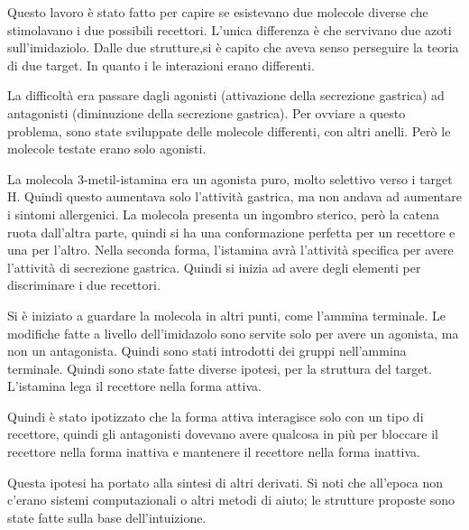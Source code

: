 Questo lavoro è stato fatto per capire se esistevano due molecole
diverse che stimolavano i due possibili recettori. L'unica differenza è
che servivano due azoti sull'imidaziolo.
Dalle due strutture,si è capito che aveva senso perseguire la teoria di
due target. In quanto i le interazioni erano differenti.


La difficoltà era passare dagli agonisti (attivazione della secrezione
gastrica) ad antagonisti (diminuzione della secrezione gastrica). Per
ovviare a questo problema, sono state sviluppate delle molecole
differenti, con altri anelli. Però le molecole testate erano solo
agonisti.


La molecola 3-metil-istamina era un agonista puro, molto selettivo verso
i target H. Quindi questo aumentava solo l'attività gastrica, ma non
andava ad aumentare i sintomi allergenici.
La molecola presenta un ingombro sterico, però la catena ruota
dall'altra parte, quindi si ha una conformazione perfetta per un
recettore e una per l'altro.
Nella seconda forma, l'istamina avrà l'attività specifica per avere
l'attività di secrezione gastrica. Quindi si inizia ad avere degli
elementi per discriminare i due recettori.


\clearpage

Si è iniziato a guardare la molecola in altri punti, come l'ammina
terminale. Le modifiche fatte a livello dell'imidazolo sono servite solo
per avere un agonista, ma non un antagonista.
Quindi sono stati introdotti dei gruppi nell'ammina terminale. Quindi
sono state fatte diverse ipotesi, per la struttura del target.
L'istamina lega il recettore nella forma attiva.

Quindi è stato ipotizzato che la forma attiva interagisce solo con un
tipo di recettore, quindi gli antagonisti dovevano avere qualcosa in più
per bloccare il recettore nella forma inattiva e mantenere il recettore
nella forma inattiva.


Questa ipotesi ha portato alla sintesi di altri derivati. Si noti che
all'epoca non c'erano sistemi computazionali o altri metodi di aiuto; le
strutture proposte sono state fatte sulla base dell'intuizione.

